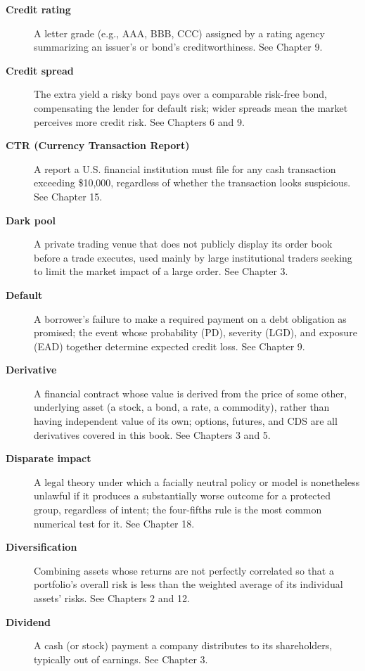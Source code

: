 \documentclass[../ai_in_finance]{subfiles}
\begin{document}
\begin{description}
\item[\textbf{Credit rating}] A letter grade (e.g., AAA, BBB, CCC) assigned by a rating agency summarizing an issuer's or bond's creditworthiness. See Chapter 9.

\item[\textbf{Credit spread}] The extra yield a risky bond pays over a comparable risk-free bond, compensating the lender for default risk; wider spreads mean the market perceives more credit risk. See Chapters 6 and 9.

\item[\textbf{CTR (Currency Transaction Report)}] A report a U.S. financial institution must file for any cash transaction exceeding \$10,000, regardless of whether the transaction looks suspicious. See Chapter 15.

\item[\textbf{Dark pool}] A private trading venue that does not publicly display its order book before a trade executes, used mainly by large institutional traders seeking to limit the market impact of a large order. See Chapter 3.

\item[\textbf{Default}] A borrower's failure to make a required payment on a debt obligation as promised; the event whose probability (PD), severity (LGD), and exposure (EAD) together determine expected credit loss. See Chapter 9.

\item[\textbf{Derivative}] A financial contract whose value is derived from the price of some other, underlying asset (a stock, a bond, a rate, a commodity), rather than having independent value of its own; options, futures, and CDS are all derivatives covered in this book. See Chapters 3 and 5.

\item[\textbf{Disparate impact}] A legal theory under which a facially neutral policy or model is nonetheless unlawful if it produces a substantially worse outcome for a protected group, regardless of intent; the four-fifths rule is the most common numerical test for it. See Chapter 18.

\item[\textbf{Diversification}] Combining assets whose returns are not perfectly correlated so that a portfolio's overall risk is less than the weighted average of its individual assets' risks. See Chapters 2 and 12.

\item[\textbf{Dividend}] A cash (or stock) payment a company distributes to its shareholders, typically out of earnings. See Chapter 3.


\end{description}
\end{document}
